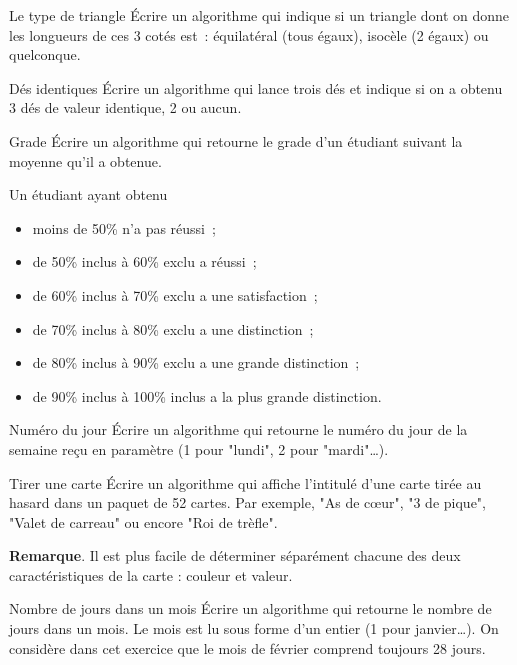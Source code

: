 	\begin{Exercice}{Le type de triangle}
		Écrire un algorithme qui indique si un triangle
		dont on donne les longueurs de ces 3 cotés est~:
		équilatéral (tous égaux), isocèle (2 égaux)
		ou quelconque.
	\end{Exercice}

	\begin{Exercice}{Dés identiques}
		Écrire un algorithme qui lance trois dés
		et indique si on a obtenu 3 dés de valeur identique,
		2 ou aucun.
	\end{Exercice}

	\begin{Exercice}{Grade}
		Écrire un algorithme qui retourne le grade d’un étudiant 
		suivant la moyenne qu’il a obtenue.
		
		Un étudiant ayant obtenu 
		\begin{itemize}
			\item moins de 50\% n’a pas réussi~;
			\item de 50\% inclus à 60\% exclu a réussi~;
			\item de 60\% inclus à 70\% exclu a une satisfaction~;
			\item de 70\% inclus à 80\% exclu a une distinction~;
			\item de 80\% inclus à 90\% exclu a une grande distinction~;
			\item de 90\% inclus à 100\% inclus a la plus grande distinction.
		\end{itemize}
	\end{Exercice}


	\begin{Exercice}{Numéro du jour}
		Écrire un algorithme qui retourne le numéro du jour de la semaine
		reçu en paramètre (1 pour "lundi", 2 pour "mardi"\dots).
	\end{Exercice}

	\begin{Exercice}{Tirer une carte}
		Écrire un algorithme qui affiche l’intitulé d’une carte
		tirée au hasard dans un paquet de 52 cartes.
		Par exemple, "As de cœur", "3 de pique", "Valet de carreau"
		ou encore "Roi de trèfle".
		
		\textbf{Remarque}. Il est plus facile de déterminer séparément
		chacune des deux caractéristiques de la carte : couleur et valeur.
	\end{Exercice}
	
	\begin{Exercice}{Nombre de jours dans un mois}
		Écrire un algorithme qui retourne le nombre de jours dans un mois. 
		Le mois est lu sous forme d’un entier (1 pour janvier\dots).
		On considère dans cet exercice que le mois de février
		comprend toujours 28 jours.
	\end{Exercice}
		

